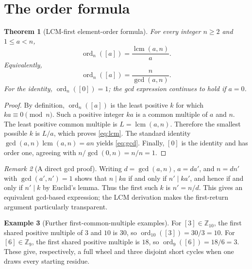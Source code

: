 \documentclass[11pt,a4paper]{article}
\newtheorem{theorem}{Theorem}[section]
\theoremstyle{definition}
\newtheorem{example}[theorem]{Example}
\theoremstyle{remark}
\newtheorem{remark}[theorem]{Remark}
\DeclareMathOperator{\ord}{ord}
\DeclareMathOperator{\lcm}{lcm}
\begin{document}
\section{The order formula}
\begin{theorem}[LCM-first element-order formula]\label{thm:order}
For every integer $n\ge2$ and $1\le a<n$,
\begin{equation}\label{eq:lcm}
\boxed{\ord_n([a])=\frac{\lcm(a,n)}{a}.}
\end{equation}
Equivalently,
\begin{equation}\label{eq:gcd}
\boxed{\ord_n([a])=\frac{n}{\gcd(a,n)}.}
\end{equation}
For the identity, $\ord_n([0])=1$; the gcd expression continues to hold if $a=0$.
\end{theorem}
\begin{proof}
By definition, $\ord_n([a])$ is the least positive $k$ for which $ka\equiv0\pmod n$. Such a positive integer $ka$ is a common multiple of $a$ and $n$. The least positive common multiple is $L=\lcm(a,n)$. Therefore the smallest possible $k$ is $L/a$, which proves \eqref{eq:lcm}. The standard identity $\gcd(a,n)\lcm(a,n)=an$ yields \eqref{eq:gcd}. Finally, $[0]$ is the identity and has order one, agreeing with $n/\gcd(0,n)=n/n=1$.
\end{proof}

\begin{remark}[A direct gcd proof]
Writing $d=\gcd(a,n)$, $a=da'$, and $n=dn'$ with $\gcd(a',n')=1$ shows that $n\mid ka$ if and only if $n'\mid ka'$, and hence if and only if $n'\mid k$ by Euclid's lemma. Thus the first such $k$ is $n'=n/d$. This gives an equivalent gcd-based expression; the LCM derivation makes the first-return argument particularly transparent.
\end{remark}

\begin{example}[Further first-common-multiple examples]
For $[3]\in\mathbb Z_{10}$, the first shared positive multiple of $3$ and $10$ is $30$, so $\ord_{10}([3])=30/3=10$. For $[6]\in\mathbb Z_9$, the first shared positive multiple is $18$, so $\ord_9([6])=18/6=3$. These give, respectively, a full wheel and three disjoint short cycles when one draws every starting residue.
\end{example}
\end{document}
